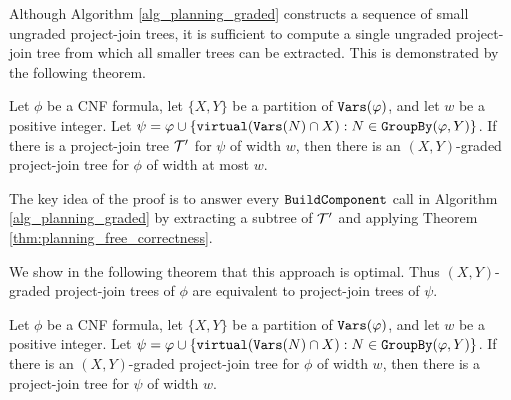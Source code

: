 Although Algorithm \ref{alg_planning_graded} constructs a sequence of small ungraded project-join trees, it is sufficient to compute a single ungraded project-join tree from which all smaller trees can be extracted. This is demonstrated by the following theorem.
\begin{theorem}
\label{thm:graded_from_virtual}
Let $\phi$ be a CNF formula, let $\{X, Y\}$ be a partition of $\texttt{\upshape Vars}(\varphi)$, and let $w$ be a positive integer. Let $\psi = \varphi \cup \{\texttt{\upshape virtual}(\texttt{\upshape Vars}(N)\cap X) : N \in \texttt{\upshape GroupBy}(\varphi, Y)\}$.
If there is a project-join tree $\mathcal{T}'$ for $\psi$ of width $w$, then there is an $(X,Y)$-graded project-join tree for $\phi$ of width at most $w$.
\end{theorem}
The key idea of the proof is to answer every $\texttt{\upshape BuildComponent}$ call in Algorithm \ref{alg_planning_graded} by extracting a subtree of $\mathcal{T}'$ and applying Theorem \ref{thm:planning_free_correctness}. %

We show in the following theorem that this approach is optimal. Thus $(X,Y)$-graded project-join trees of $\phi$ are equivalent to project-join trees of $\psi$.
\begin{theorem}
\label{thm:planning_graded_optimal}
Let $\phi$ be a CNF formula, let $\{X, Y\}$ be a partition of $\texttt{\upshape Vars}(\varphi)$, and let $w$ be a positive integer. Let $\psi = \varphi \cup \{\texttt{\upshape virtual}(\texttt{\upshape Vars}(N)\cap X) : N \in \texttt{\upshape GroupBy}(\varphi, Y)\}$. %
If there is an $(X,Y)$-graded project-join tree for $\phi$ of width $w$, then there is a project-join tree for $\psi$ of width $w$.
\end{theorem}

